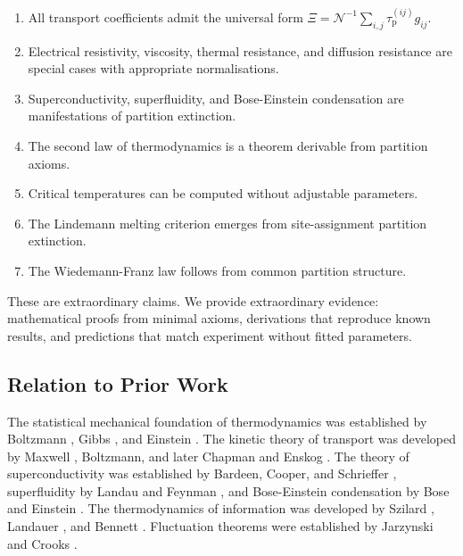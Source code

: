 \documentclass[twocolumn,10pt,aps,prd,superscriptaddress,nofootinbib]{revtex4-2}
\theoremstyle{remark}
\newcommand{\tauP}{\tau_{\mathrm{p}}}
\newcommand{\Gij}{g_{ij}}
\newcommand{\Norm}{\mathcal{N}}
\newcommand{\Transp}{\Xi}
\begin{document}
\begin{enumerate}
\item All transport coefficients admit the universal form $\Transp = \Norm^{-1} \sum_{i,j} \tauP^{(ij)} \Gij$.

\item Electrical resistivity, viscosity, thermal resistance, and diffusion resistance are special cases with appropriate normalisations.

\item Superconductivity, superfluidity, and Bose-Einstein condensation are manifestations of partition extinction.

\item The second law of thermodynamics is a theorem derivable from partition axioms.

\item Critical temperatures can be computed without adjustable parameters.

\item The Lindemann melting criterion emerges from site-assignment partition extinction.

\item The Wiedemann-Franz law follows from common partition structure.
\end{enumerate}

These are extraordinary claims. We provide extraordinary evidence: mathematical proofs from minimal axioms, derivations that reproduce known results, and predictions that match experiment without fitted parameters.

\subsection{Relation to Prior Work}

The statistical mechanical foundation of thermodynamics was established by Boltzmann \cite{boltzmann1872,boltzmann1877,boltzmann1896}, Gibbs \cite{gibbs1902}, and Einstein \cite{einstein1905brownian}. The kinetic theory of transport was developed by Maxwell \cite{maxwell1867}, Boltzmann, and later Chapman and Enskog \cite{chapman1990}. The theory of superconductivity was established by Bardeen, Cooper, and Schrieffer \cite{bardeen1957}, superfluidity by Landau \cite{landau1941} and Feynman \cite{feynman1955}, and Bose-Einstein condensation by Bose \cite{bose1924} and Einstein \cite{einstein1924,einstein1925}. The thermodynamics of information was developed by Szilard \cite{szilard1929}, Landauer \cite{landauer1961}, and Bennett \cite{bennett1982,bennett2003}. Fluctuation theorems were established by Jarzynski \cite{jarzynski1997} and Crooks \cite{crooks1999}.
\end{document}
